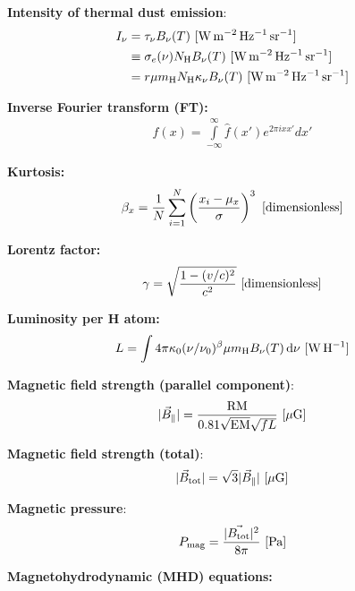 \documentclass[a4paper,10pt]{article}
\begin{document}
{\noindent}\textbf{Intensity of thermal dust emission}:
\begin{align*}
    I_\nu &= \tau_\nu B_\nu(T) ~ [{\rm W\,m^{-2}\,Hz^{-1}\,sr^{-1}}] \\
             &\equiv \sigma_e(\nu)N_{\rm H}B_\nu(T) ~ [{\rm W\,m^{-2}\,Hz^{-1}\,sr^{-1}}] \\
             &= r\mu m_{\rm H}N_{\rm H}\kappa_\nu B_\nu(T) ~ [{\rm W\,m^{-2}\,Hz^{-1}\,sr^{-1}}]
\end{align*}

{\noindent}\textbf{Inverse Fourier transform (FT):}
\begin{align*}
    f(x) = \int\limits_{-\infty}^\infty \hat{f}(x')e^{2\pi ixx'}dx'
\end{align*}

{\noindent}\textbf{Kurtosis:}
\begin{align*}
    \beta_x = \frac{1}{N} \sum_{i=1}^N \left(\frac{x_i-\mu_x}{\sigma}\right)^3 ~ [{\rm dimensionless}]
\end{align*}

{\noindent}\textbf{Lorentz factor:}
\begin{align*}
    \gamma = \sqrt{\frac{1 - (v/c)^2}{c^2}} ~ [{\rm dimensionless}]
\end{align*}

{\noindent}\textbf{Luminosity per H atom:}
\begin{align*}
    L = \int 4\pi\kappa_0(\nu/\nu_0)^\beta \mu m_{\rm H}B_\nu(T) \,{\rm d}\nu ~ [{\rm W\,H^{-1}}]
\end{align*}

{\noindent}\textbf{Magnetic field strength (parallel component)}:
\begin{align*}
    \lvert\vec{B}_\parallel\rvert = \frac{\rm RM}{0.81\sqrt{\rm EM}\sqrt{fL}} ~[{\rm \mu G]}
\end{align*}

{\noindent}\textbf{Magnetic field strength (total)}:
\begin{align*}
    \lvert\vec{B}_{\rm tot}\rvert = \sqrt{3}\lvert\vec{B}_\parallel\rvert ~[{\rm \mu G]}
\end{align*}

{\noindent}\textbf{Magnetic pressure}:
\begin{align*}
    P_{\rm mag} = \frac{\lvert\vec{B_{\rm tot}}\rvert^2}{8\pi}~ [{\rm Pa]}
\end{align*}

{\noindent}\textbf{Magnetohydrodynamic (MHD) equations:}
\end{document}
